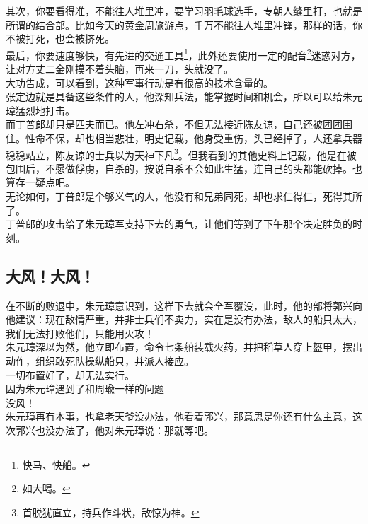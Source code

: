 \begin{multicols}{\theparacolNo}
其次，你要看得准，不能往人堆里冲，要学习羽毛球选手，专朝人缝里打，也就是所谓的结合部。比如今天的黄金周旅游点，千万不能往人堆里冲锋，那样的话，你不被打死，也会被挤死。\\

最后，你要速度够快，有先进的交通工具\footnote{快马、快船。}，此外还要使用一定的配音\footnote{如大喝。}迷惑对方，让对方丈二金刚摸不着头脑，再来一刀，头就没了。\\

大功告成，可以看到，这种军事行动是有很高的技术含量的。\\

张定边就是具备这些条件的人，他深知兵法，能掌握时间和机会，所以可以给朱元璋猛烈地打击。\\

而丁普郎却只是匹夫而已。他左冲右杀，不但无法接近陈友谅，自己还被团团围住。性命不保，却也相当悲壮，明史记载，他身受重伤，头已经掉了，人还拿兵器稳稳站立，陈友谅的士兵以为天神下凡\footnote{首脱犹直立，持兵作斗状，敌惊为神。}。但我看到的其他史料上记载，他是在被包围后，不愿做俘虏，自杀的，按说自杀不会如此生猛，连自己的头都能砍掉。也算存一疑点吧。\\

无论如何，丁普郎是个够义气的人，他没有和兄弟同死，却也求仁得仁，死得其所了。\\

丁普郎的攻击给了朱元璋军支持下去的勇气，让他们等到了下午那个决定胜负的时刻。\\

\subsection{大风！大风！}
在不断的败退中，朱元璋意识到，这样下去就会全军覆没，此时，他的部将郭兴向他建议：现在敌情严重，并非士兵们不卖力，实在是没有办法，敌人的船只太大，我们无法打败他们，只能用火攻！\\

朱元璋深以为然，他立即布置，命令七条船装载火药，并把稻草人穿上盔甲，摆出动作，组织敢死队操纵船只，并派人接应。\\

一切布置好了，却无法实行。\\

因为朱元璋遇到了和周瑜一样的问题——\\

没风！\\

朱元璋再有本事，也拿老天爷没办法，他看着郭兴，那意思是你还有什么主意，这次郭兴也没办法了，他对朱元璋说：那就等吧。\\


\end{multicols}
